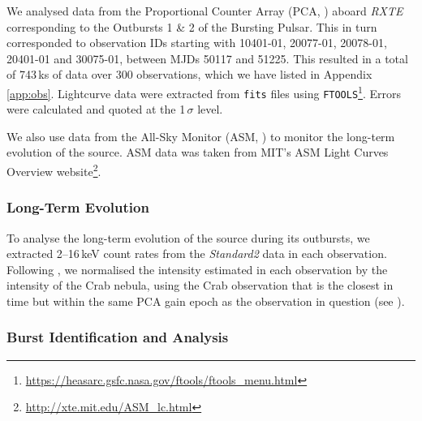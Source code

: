 \par We analysed data from the Proportional Counter Array (PCA, \citealp{Jahoda_PCA}) aboard \textit{RXTE} corresponding to the Outbursts 1 \& 2 of the Bursting Pulsar.  This in turn corresponded to observation IDs starting with 10401-01, 20077-01, 20078-01, 20401-01 and 30075-01, between MJDs 50117 and 51225.  This resulted in a total of 743\,ks of data over 300 observations, which we have listed in Appendix \ref{app:obs}. Lightcurve data were extracted from \texttt{fits} files using \texttt{FTOOLS}\footnote{\url{https://heasarc.gsfc.nasa.gov/ftools/ftools_menu.html}}.  Errors were calculated and quoted at the 1$\,\sigma$ level.
\par We also use data from the All-Sky Monitor (ASM, \citealp{Levine_ASM}) to monitor the long-term evolution of the source.  ASM data was taken from MIT's ASM Light Curves Overview website\footnote{\url{http://xte.mit.edu/ASM_lc.html}}.

\subsubsection{Long-Term Evolution}

\par To analyse the long-term evolution of the source during its outbursts, we extracted 2--16\,keV count rates from the \textit{Standard2} data in each observation.  Following \citet{Altamirano_CrabNorm}, we normalised the intensity estimated in each observation by the intensity of the Crab nebula, using the Crab observation that is the closest in time but within the same PCA gain epoch as the observation in question (see \citealp{Jahoda_Calibrate}).

\subsubsection{Burst Identification and Analysis}

\label{sec:burst_diff}

